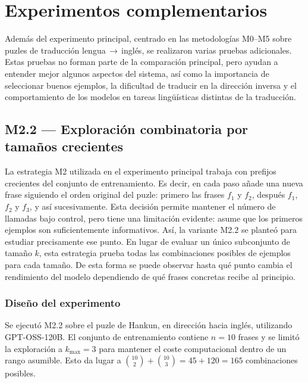 \section{Experimentos complementarios}
\label{sec:experimentos-complementarios}

Además del experimento principal, centrado en las metodologías M0--M5 sobre puzles de traducción lengua\,$\rightarrow$\,inglés, se realizaron varias pruebas adicionales. Estas pruebas no forman parte de la comparación principal, pero ayudan a entender mejor algunos aspectos del sistema, así como la importancia de seleccionar buenos ejemplos, la dificultad de traducir en la dirección inversa y el comportamiento de los modelos en tareas lingüísticas distintas de la traducción.

\subsection{M2.2 — Exploración combinatoria por tamaños crecientes}
\label{subsec:m22}

La estrategia M2 utilizada en el experimento principal trabaja con prefijos crecientes del conjunto de entrenamiento. Es decir, en cada paso añade una nueva frase siguiendo el orden original del puzle: primero las frases $f_1$ y $f_2$, después $f_1$, $f_2$ y $f_3$, y así sucesivamente. Esta decisión permite mantener el número de llamadas bajo control, pero tiene una limitación evidente: asume que los primeros ejemplos son suficientemente informativos. Así, la variante M2.2 se planteó para estudiar precisamente ese punto. En lugar de evaluar un único subconjunto de tamaño $k$, esta estrategia prueba todas las combinaciones posibles de ejemplos para cada tamaño. De esta forma se puede observar hasta qué punto cambia el rendimiento del modelo dependiendo de qué frases concretas recibe al principio.

\subsubsection*{Diseño del experimento}

Se ejecutó M2.2 sobre el puzle de Hankun, en dirección hacia inglés, utilizando GPT-OSS-120B. El conjunto de entrenamiento contiene $n=10$ frases y se limitó la exploración a $k_{\max}=3$ para mantener el coste computacional dentro de un rango asumible. Esto da lugar a $\binom{10}{2}+\binom{10}{3}=45+120=165$ combinaciones posibles.

